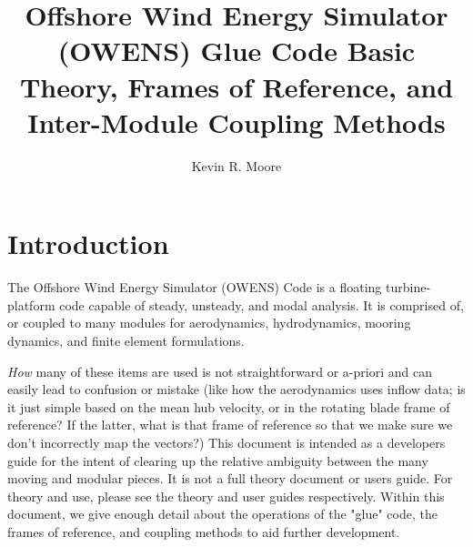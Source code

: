 \documentclass[11pt]{article}
\title{Offshore Wind Energy Simulator (OWENS) Glue Code Basic Theory, Frames of Reference, and Inter-Module Coupling Methods}
\author{Kevin R. Moore}
\begin{document}
\maketitle

%



\section{Introduction}

The Offshore Wind Energy Simulator (OWENS) Code is a floating turbine-platform code capable of steady, unsteady, and modal analysis.  It is comprised of, or coupled to many modules for aerodynamics, hydrodynamics, mooring dynamics, and finite element formulations.

\textit{How} many of these items are used is not straightforward or a-priori and can easily lead to confusion or mistake (like how the aerodynamics uses inflow data; is it just simple based on the mean hub velocity, or in the rotating blade frame of reference?  If the latter, what is that frame of reference so that we make sure we don't incorrectly map the vectors?) This document is intended as a developers guide for the intent of clearing up the relative ambiguity between the many moving and modular pieces.  It is not a full theory document or users guide.  For theory and use, please see the theory and user guides respectively. Within this document, we give enough detail about the operations of the "glue" code, the frames of reference, and coupling methods to aid further development. 

\end{document}
